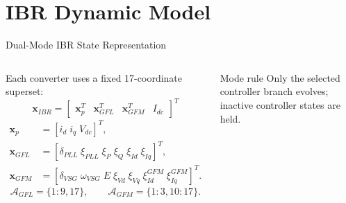 \documentclass{beamer}
\begin{document}
\section{IBR Dynamic Model}
\begin{frame}{Dual-Mode IBR State Representation}
\begin{columns}[c,onlytextwidth]
\footnotesize
Each converter uses a fixed 17-coordinate superset:
\[
\boxed{\bm{x}_{IBR}=\begin{bmatrix}\bm{x}_{p}^{T}&\bm{x}_{GFL}^{T}&\bm{x}_{GFM}^{T}&I_{dc}\end{bmatrix}^{T}}
\]
\begin{align*}
\bm{x}_{p}&=[i_d\;i_q\;V_{dc}]^T,\\
\bm{x}_{GFL}&=[\delta_{PLL}\;\xi_{PLL}\;\xi_P\;\xi_Q\;\xi_{Id}\;\xi_{Iq}]^T,\\
\bm{x}_{GFM}&=[\delta_{VSG}\;\omega_{VSG}\;E\;\xi_{Vd}\;\xi_{Vq}\;\xi_{Id}^{GFM}\;\xi_{Iq}^{GFM}]^T.
\end{align*}
\[
\mathcal{A}_{GFL}=\{1{:}9,17\},\qquad
\mathcal{A}_{GFM}=\{1{:}3,10{:}17\}.
\]
\centering
{}
\vspace{0.25cm}
\begin{block}{Mode rule}
Only the selected controller branch evolves; inactive controller states are held.
\end{block}
\end{columns}
\end{frame}
\end{document}
